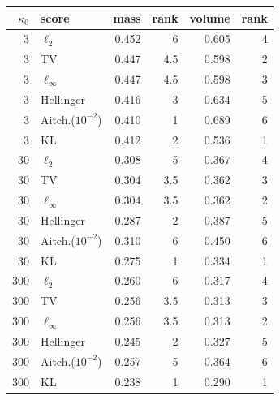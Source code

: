 \begin{tabular}{rlrrrr}
\toprule
$\kappa_0$ & score & mass & rank & volume & rank \\
\midrule
3 & $\ell_2$ & 0.452 & 6 & 0.605 & 4 \\
3 & TV & 0.447 & 4.5 & 0.598 & 2 \\
3 & $\ell_\infty$ & 0.447 & 4.5 & 0.598 & 3 \\
3 & Hellinger & 0.416 & 3 & 0.634 & 5 \\
3 & Aitch.($10^{-2}$) & 0.410 & 1 & 0.689 & 6 \\
3 & KL & 0.412 & 2 & 0.536 & 1 \\
\midrule
30 & $\ell_2$ & 0.308 & 5 & 0.367 & 4 \\
30 & TV & 0.304 & 3.5 & 0.362 & 3 \\
30 & $\ell_\infty$ & 0.304 & 3.5 & 0.362 & 2 \\
30 & Hellinger & 0.287 & 2 & 0.387 & 5 \\
30 & Aitch.($10^{-2}$) & 0.310 & 6 & 0.450 & 6 \\
30 & KL & 0.275 & 1 & 0.334 & 1 \\
\midrule
300 & $\ell_2$ & 0.260 & 6 & 0.317 & 4 \\
300 & TV & 0.256 & 3.5 & 0.313 & 3 \\
300 & $\ell_\infty$ & 0.256 & 3.5 & 0.313 & 2 \\
300 & Hellinger & 0.245 & 2 & 0.327 & 5 \\
300 & Aitch.($10^{-2}$) & 0.257 & 5 & 0.364 & 6 \\
300 & KL & 0.238 & 1 & 0.290 & 1 \\
\bottomrule
\end{tabular}
